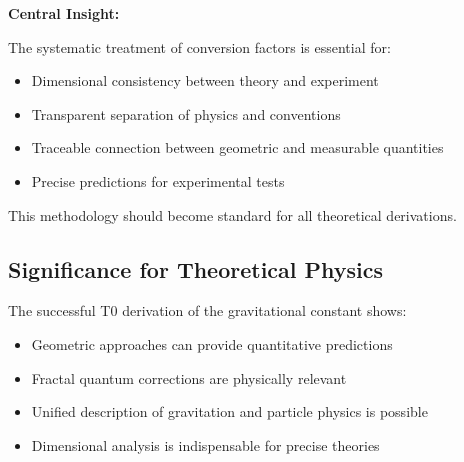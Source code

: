 	\begin{keyresult}
		\textbf{Central Insight:}
		
		The systematic treatment of conversion factors is essential for:
		\begin{itemize}
			\item Dimensional consistency between theory and experiment
			\item Transparent separation of physics and conventions
			\item Traceable connection between geometric and measurable quantities
			\item Precise predictions for experimental tests
		\end{itemize}
		
		This methodology should become standard for all theoretical derivations.
	\end{keyresult}
	
	\subsection{Significance for Theoretical Physics}
	
	The successful T0 derivation of the gravitational constant shows:
	\begin{itemize}
		\item Geometric approaches can provide quantitative predictions
		\item Fractal quantum corrections are physically relevant
		\item Unified description of gravitation and particle physics is possible
		\item Dimensional analysis is indispensable for precise theories
	\end{itemize}
